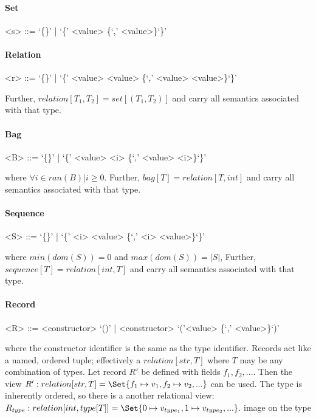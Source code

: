 \paragraph{Set}
\begin{grammar}
<s> ::= `\{\}' | `\{' <value> \{`,' <value>\}`\}'
\end{grammar}
\paragraph{Relation}
\begin{grammar}
<r> ::= `\{\}' | `\{' <value> \lit{$\mapsto$} <value> \{`,' <value> \lit{$\mapsto$} <value>\}`\}'
\end{grammar}
Further, $relation[T_1, T_2] = set[(T_1, T_2)]$ and carry all semantics associated with that type.
\paragraph{Bag}
\begin{grammar}
<B> ::= `\{\}' | `\{' <value> \lit{$\mapsto$} <i> \{`,' <value> \lit{$\mapsto$} <i>\}`\}'
\end{grammar}
where $\forall i \in ran(B) | i \geq 0$. Further, $bag[T] = relation[T, int]$ and carry all semantics associated with that type.
\paragraph{Sequence}
\begin{grammar}
<S> ::= `\{\}' | `\{' <i> \lit{$\mapsto$} <value> \{`,' <i> \lit{$\mapsto$} <value>\}`\}'
\end{grammar}
where $min(dom(S)) = 0$ and $max(dom(S)) = |S|$, Further, $sequence[T] = relation[int, T]$ and carry all semantics associated with that type.
\paragraph{Record}
\begin{grammar}
<R> ::= <constructor> `()' | <constructor> `('<value> \{`,' <value>\}`)'
\end{grammar}
where the constructor identifier is the same as the type identifier. Records act like a named, ordered tuple; effectively a $relation[str, T]$ where $T$ may be any combination of types. Let record $R'$ be defined with fields $f_1, f_2, ...$. Then the view $R': relation[str, T] = \Set{f_1 \mapsto v_1, f_2 \mapsto v_2, ...}$ can be used. The type is inherently ordered, so there is a another relational view: $R_{type}: relation[int, type[T]] = \Set{0 \mapsto v_{type_1}, 1 \mapsto v_{type_2}, ...}$. image on the type

